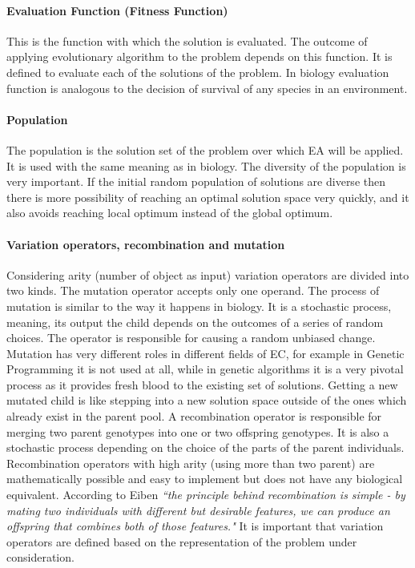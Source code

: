 \documentclass[letterpaper]{article}
\numberwithin{equation}{section}
\begin{document}
\paragraph{Evaluation Function (Fitness Function)}
This is the function with which the solution is evaluated. The outcome of applying evolutionary algorithm to the problem depends on this function. It is defined to evaluate each of the solutions of the problem. In biology evaluation function is analogous to the decision of survival of any species in an environment. 

\paragraph{Population}
The population is the solution set of the problem over which EA will be applied. It is used with the same meaning as in biology. The diversity of the population is very important. If the initial random population of solutions are diverse then there is more possibility of reaching an optimal solution space very quickly, and it also avoids reaching local optimum instead of the global optimum.

\paragraph{Variation operators, recombination and mutation}
Considering arity (number of object as input) variation operators are divided into two kinds. The mutation operator accepts only one operand. The process of mutation is similar to the way it happens in biology. It is a stochastic process, meaning, its output the child depends on the outcomes of a series of random choices. The operator is responsible for causing a random unbiased change. Mutation has very different roles in different fields of EC, for example in Genetic Programming it is not used at all, while in genetic algorithms it is a very pivotal process as it provides fresh blood to the existing set of solutions. Getting a new mutated child is like stepping into a new solution space outside of the ones which already exist in the parent pool. A recombination operator is responsible for merging two parent genotypes into one or two offspring genotypes. It is also a stochastic process depending on the choice of the parts of the parent individuals. Recombination operators with high arity (using more than two parent) are mathematically possible and easy to implement but does not have any biological equivalent. According to Eiben \cite{eiben2003} \textsl{``the principle behind recombination is simple - by mating two individuals with different but desirable features, we can produce an offspring that combines both of those features."} It is important that variation operators are defined based on the representation of the problem under consideration. 
\end{document}
